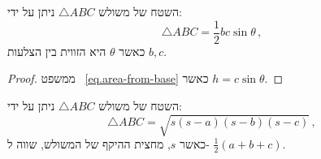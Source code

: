 \begin{theorem}
השטח של משולש 
$\triangle ABC$
ניתן על ידי:
\begin{equation}\label{eq.area-from-sine}
\triangle ABC = \frac{1}{2}bc\sin \theta\,,
\end{equation}
כאשר 
$\theta$
היא הזווית בין הצלעות
$b,c$.
\end{theorem}
\begin{proof}
ממשפט%
~\ref{eq.area-from-base}
כאשר
$h=c\sin \theta$.
\end{proof}


\begin{theorem}\label{thm.heron}
השטח של משולש 
$\triangle ABC$
ניתן על ידי:
\[
\triangle ABC = \sqrt{s(s-a)(s-b)(s-c)}\,,
\]
כאשר 
$s$,
מחצית ההיקף של המשולש, שווה ל-%
$\frac{1}{2}(a+b+c)$.
\end{theorem}

